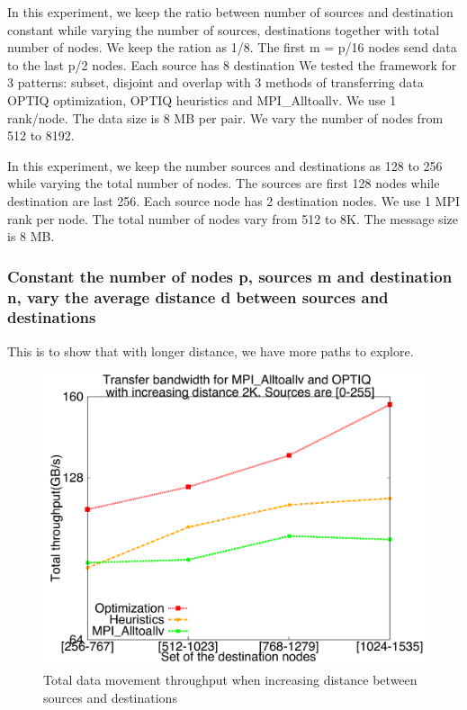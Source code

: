 In this experiment, we keep the ratio between number of sources and destination constant while varying the number of sources, destinations together with total number of nodes. We keep the ration as 1/8. The first m = p/16 nodes send data to the last p/2 nodes. Each source has 8 destination We tested the framework for 3 patterns: subset, disjoint and overlap with 3 methods of transferring data OPTIQ optimization, OPTIQ heuristics and MPI\_Alltoallv. We use 1 rank/node. The data size is 8 MB per pair. We vary the number of nodes from 512 to 8192.

In this experiment, we keep the number sources and destinations as 128 to 256 while varying the total number of nodes. The sources are first 128 nodes while destination are last 256. Each source node has 2 destination nodes. We use 1 MPI rank per node. The total number of nodes vary from 512 to 8K. The message size is 8 MB.

\subsubsection{Constant the number of nodes p, sources m and destination n, vary the average distance d between sources and destinations}
This is to show that with longer distance, we have more paths to explore.

\begin{figure}[!htb]
\vspace{-0.1in}
\centering
\includegraphics[scale=0.30]{figures/incrdist.pdf}
\vspace{-0.1in}
\caption{Total data movement throughput when increasing distance between sources and destinations}
\vspace{-0.1in}
\label{fig:chunksize}
\end{figure}

